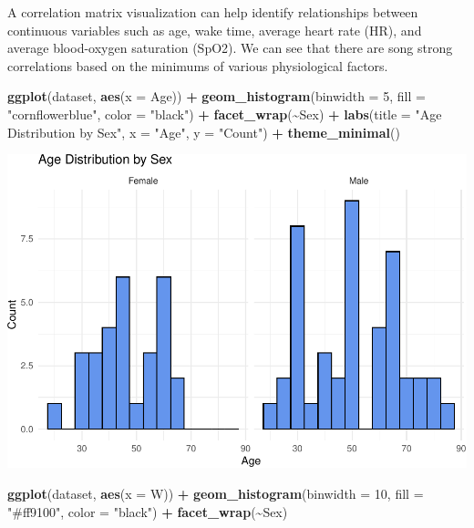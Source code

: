 \documentclass[
]{article}
\newenvironment{Shaded}{\begin{snugshade}}{\end{snugshade}}
\newcommand{\AttributeTok}[1]{\textcolor[rgb]{0.13,0.29,0.53}{#1}}
\newcommand{\DecValTok}[1]{\textcolor[rgb]{0.00,0.00,0.81}{#1}}
\newcommand{\FunctionTok}[1]{\textcolor[rgb]{0.13,0.29,0.53}{\textbf{#1}}}
\newcommand{\NormalTok}[1]{#1}
\newcommand{\SpecialCharTok}[1]{\textcolor[rgb]{0.81,0.36,0.00}{\textbf{#1}}}
\newcommand{\StringTok}[1]{\textcolor[rgb]{0.31,0.60,0.02}{#1}}
\begin{document}
A correlation matrix visualization can help identify relationships
between continuous variables such as age, wake time, average heart rate
(HR), and average blood-oxygen saturation (SpO2). We can see that there
are song strong correlations based on the minimums of various
physiological factors.

\begin{Shaded}
\begin{Highlighting}[]
\FunctionTok{ggplot}\NormalTok{(dataset, }\FunctionTok{aes}\NormalTok{(}\AttributeTok{x =}\NormalTok{ Age)) }\SpecialCharTok{+} \FunctionTok{geom\_histogram}\NormalTok{(}\AttributeTok{binwidth =} \DecValTok{5}\NormalTok{,}
    \AttributeTok{fill =} \StringTok{"cornflowerblue"}\NormalTok{, }\AttributeTok{color =} \StringTok{"black"}\NormalTok{) }\SpecialCharTok{+} \FunctionTok{facet\_wrap}\NormalTok{(}\SpecialCharTok{\textasciitilde{}}\NormalTok{Sex) }\SpecialCharTok{+}
    \FunctionTok{labs}\NormalTok{(}\AttributeTok{title =} \StringTok{"Age Distribution by Sex"}\NormalTok{, }\AttributeTok{x =} \StringTok{"Age"}\NormalTok{, }\AttributeTok{y =} \StringTok{"Count"}\NormalTok{) }\SpecialCharTok{+}
    \FunctionTok{theme\_minimal}\NormalTok{()}
\end{Highlighting}
\end{Shaded}

\includegraphics{602_project_files/figure-latex/unnamed-chunk-15-1.pdf}

\begin{Shaded}
\begin{Highlighting}[]
\FunctionTok{ggplot}\NormalTok{(dataset, }\FunctionTok{aes}\NormalTok{(}\AttributeTok{x =}\NormalTok{ W)) }\SpecialCharTok{+} \FunctionTok{geom\_histogram}\NormalTok{(}\AttributeTok{binwidth =} \DecValTok{10}\NormalTok{, }\AttributeTok{fill =} \StringTok{"\#ff9100"}\NormalTok{,}
    \AttributeTok{color =} \StringTok{"black"}\NormalTok{) }\SpecialCharTok{+} \FunctionTok{facet\_wrap}\NormalTok{(}\SpecialCharTok{\textasciitilde{}}\NormalTok{Sex)}
\end{Highlighting}
\end{Shaded}
\end{document}
